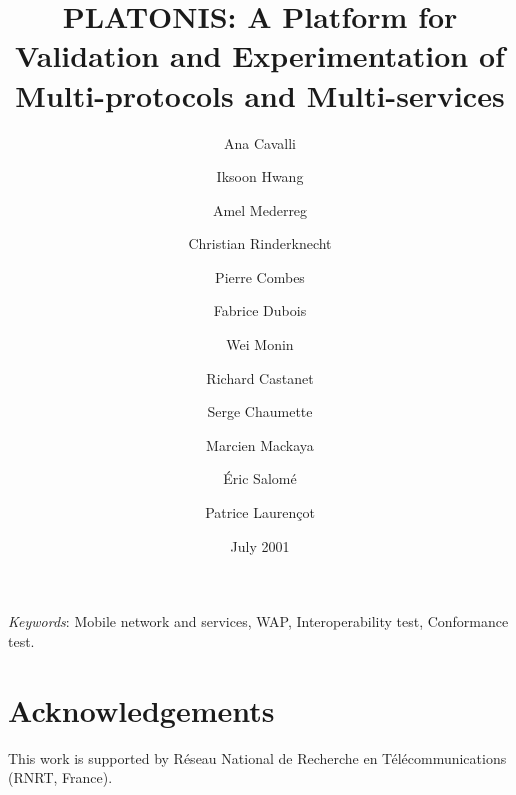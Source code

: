 \documentclass{article}
\title{PLATONIS: A Platform for Validation and Experimentation of
  Multi-protocols and Multi-services}
\author{Ana Cavalli \and Iksoon Hwang
\and Amel Mederreg \and Christian Rinderknecht
\and Pierre Combes \and Fabrice Dubois
\and Wei Monin \and Richard Castanet
\and Serge Chaumette \and Marcien Mackaya
\and \'Eric Salom\'e \and Patrice Lauren\c{c}ot}
\date{July 2001}
\begin{document}
\maketitle



\textsl{Keywords}: Mobile network and services, WAP, Interoperability
test, Conformance test.







\section*{Acknowledgements}
This work is supported by R\'eseau National de 
Recherche en T\'el\'ecommunications (RNRT, France).




%
\end{document}
